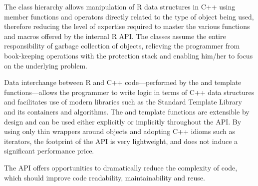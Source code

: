 The class hierarchy allows manipulation of R data structures in C++ 
using member functions and operators directly related to the type
of object being used, therefore reducing the level of expertise
required to master the various functions and macros offered by the
internal R API. The classes assume the entire 
responsibility of garbage collection of objects, relieving the 
programmer from book-keeping operations with the protection stack 
and enabling him/her to focus on the underlying problem. 

Data interchange between R and C++ code---performed by the  and
 template functions---allows the programmer to write logic in terms
of C++ data structures and facilitates use of modern libraries such as the
Standard Template Library and its containers and algorithms. The
 and  template functions are extensible by design and
can be used either explicitly or implicitly throughout the API.
By using only thin wrappers around  objects and adopting C++
idioms such as iterators, the footprint of the  API 
is very lightweight, and does not induce a significant performance price. 

The  API offers opportunities to dramatically reduce the complexity 
of code, which should improve code readability, maintainability and reuse.



\address{Dirk Eddelbuettel\\
  Debian Project\\
  Chicago, IL\\
  USA}\\

\address{Romain Fran\c{c}ois\\
  Professional R Enthusiast\\
  1 rue du Puits du Temple, 34 000 Montpellier\\
  FRANCE}\\

